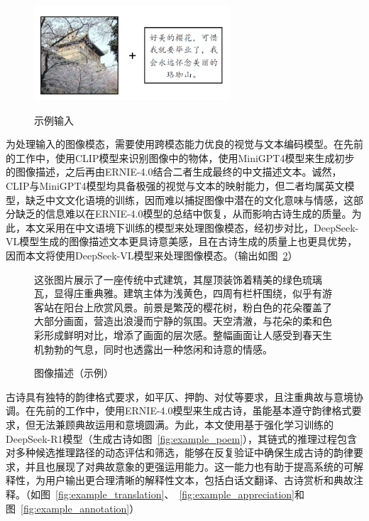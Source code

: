 \begin{figure}[ht]
  \centering
  \includegraphics[width=0.65\textwidth]
  {figures/示例输入.png}\\
  \caption{示例输入}
  \label{fig:example_input} %
\end{figure}

为处理输入的图像模态，需要使用跨模态能力优良的视觉与文本编码模型。在先前的工作中，使用CLIP模型来识别图像中的物体，使用MiniGPT4模型来生成初步的图像描述，之后再由ERNIE-4.0结合二者生成最终的中文描述文本。诚然，CLIP与MiniGPT4模型均具备极强的视觉与文本的映射能力，但二者均属英文模型，缺乏中文文化语境的训练，因而难以捕捉图像中潜在的文化意味与情感，这部分缺乏的信息难以在ERNIE-4.0模型的总结中恢复，从而影响古诗生成的质量。为此，本文采用在中文语境下训练的模型来处理图像模态，经初步对比，DeepSeek-VL模型生成的图像描述文本更具诗意美感，且在古诗生成的质量上也更具优势，因而本文将使用DeepSeek-VL模型来处理图像模态。（输出如图~\ref{fig:image_description}）

\begin{figure}[ht]
  \begin{tcolorbox}[
      colback=white, %
      colframe=black, 
      boxrule=1pt,        %
      arc=0mm,             %
  ]
      \kaishu 这张图片展示了一座传统中式建筑，其屋顶装饰着精美的绿色琉璃瓦，显得庄重典雅。建筑主体为浅黄色，四周有栏杆围绕，似乎有游客站在阳台上欣赏风景。前景是繁茂的樱花树，粉白色的花朵覆盖了大部分画面，营造出浪漫而宁静的氛围。天空清澈，与花朵的柔和色彩形成鲜明对比，增添了画面的层次感。整幅画面让人感受到春天生机勃勃的气息，同时也透露出一种悠闲和诗意的情感。
  \end{tcolorbox}
  \caption{图像描述（示例）}
  \label{fig:image_description} %
\end{figure}


古诗具有独特的韵律格式要求，如平仄、押韵、对仗等要求，且注重典故与意境协调。在先前的工作中，使用ERNIE-4.0模型来生成古诗，虽能基本遵守韵律格式要求，但无法兼顾典故运用和意境圆满。为此，本文使用基于强化学习训练的DeepSeek-R1模型（生成古诗如图~\ref{fig:example_poem}），其链式的推理过程包含对多种候选推理路径的动态评估和筛选，能够在反复验证中确保生成古诗的韵律要求，并且也展现了对典故意象的更强运用能力。这一能力也有助于提高系统的可解释性，为用户输出更合理清晰的解释性文本，包括白话文翻译、古诗赏析和典故注释。（如图~\ref{fig:example_translation}、~\ref{fig:example_appreciation}和图~\ref{fig:example_annotation}）

